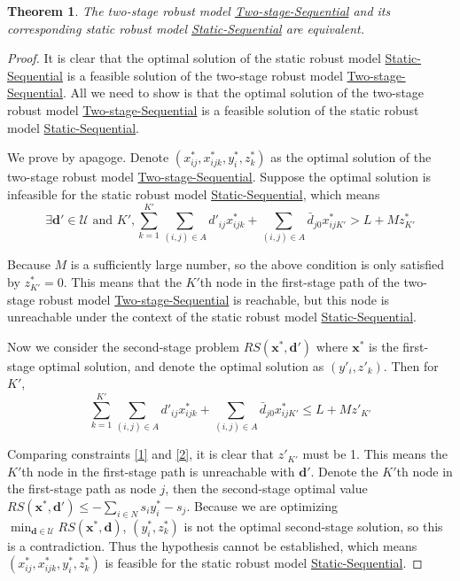 \documentclass[preprint,review,10pt,round,authoryear]{elsarticle}\usepackage[]{graphicx}\usepackage[]{color}
\theoremstyle{plain}
\newtheorem{thm}{Theorem}
\theoremstyle{definition}
\theoremstyle{remark}
\begin{document}
\begin{thm}
\label{thm:1}
The two-stage robust model \hyperref[2ro:1]{Two-stage-Sequential} and its corresponding static robust model \hyperref[sro:1]{Static-Sequential} are equivalent.
\end{thm}
\begin{proof}
It is clear that the optimal solution of the static robust model \hyperref[sro:1]{Static-Sequential} is a feasible solution of the two-stage robust model \hyperref[2ro:1]{Two-stage-Sequential}. All we need to show is that the optimal solution of the two-stage robust model \hyperref[2ro:1]{Two-stage-Sequential} is a feasible solution of the static robust model \hyperref[sro:1]{Static-Sequential}. 

We prove by apagoge. Denote $(x_{ij}^*,x_{ijk}^*,y_i^*,z_k^*)$ as the optimal solution of the two-stage robust model \hyperref[2ro:1]{Two-stage-Sequential}. Suppose the optimal solution is infeasible for the static robust model \hyperref[sro:1]{Static-Sequential}, which means 
\begin{equation}
\exists \mathbf{d}'\in\mathcal{U}\text{ and }K', \sum_{k=1}^{K'}\sum_{(i,j)\in A}d'_{ij}x_{ijk}^* + \sum_{(i,j)\in A}\bar{d}_{j0}x_{ijK'}^* > L + Mz_{K'}^*\label{1}
\end{equation}

Because $M$ is a sufficiently large number, so the above condition is only satisfied by $z_{K'}^*=0$. This means that the $K'$th node in the first-stage path of the two-stage robust model \hyperref[2ro:1]{Two-stage-Sequential} is reachable, but this node is unreachable under the context of the static robust model \hyperref[sro:1]{Static-Sequential}.

Now we consider the second-stage problem $RS(\mathbf{x}^*,\mathbf{d}')$ where $\mathbf{x}^*$ is the first-stage optimal solution, and denote the optimal solution as $(y'_i,z'_k)$. Then for $K'$,
\begin{equation}
\sum_{k=1}^{K'}\sum_{(i,j)\in A}d'_{ij}x_{ijk}^* + \sum_{(i,j)\in A}\bar{d}_{j0}x_{ijK'}^* \leq L + Mz'_{K'}\label{2}
\end{equation}

Comparing constraints \eqref{1} and \eqref{2}, it is clear that $z'_{K'}$ must be 1. This means the $K'$th node in the first-stage path is unreachable with $\mathbf{d}'$. Denote the $K'$th node in the first-stage path as node $j$, then the second-stage optimal value $RS(\mathbf{x}^*,\mathbf{d}')\leq -\sum_{i\in N}s_i y_i^*-s_{j}$. Because we are optimizing $\min_{\mathbf{d}\in\mathcal{U}}RS(\mathbf{x}^*,\mathbf{d})$, $(y_i^*,z_k^*)$ is not the optimal second-stage solution, so this is a contradiction. Thus the hypothesis cannot be established, which means $(x_{ij}^*,x_{ijk}^*,y_i^*,z_k^*)$ is feasible for the static robust model \hyperref[sro:1]{Static-Sequential}.


\end{proof}
\end{document}
